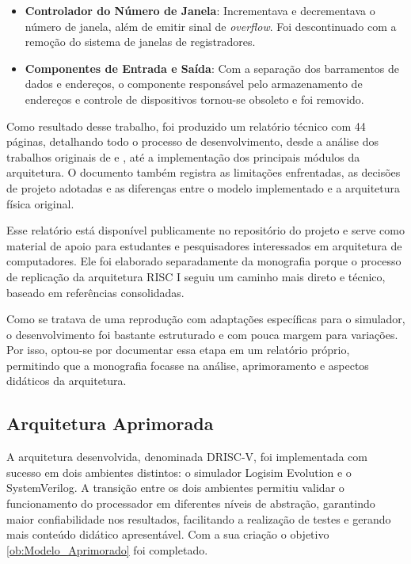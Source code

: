 \documentclass[
	12pt,				%
	openright,			%
	oneside,			%
	a4paper,			%
	english,			%
	french,				%
	spanish,			%
	brazil,				%
	]{abntex2}
\begin{document}
\begin{itemize}
    \item \textbf{Controlador do Número de Janela}: Incrementava e decrementava o número de janela, além de emitir sinal de \textit{overflow}. Foi descontinuado com a remoção do sistema de janelas de registradores.

    \item \textbf{Componentes de Entrada e Saída}: Com a separação dos barramentos de dados e endereços, o componente responsável pelo armazenamento de endereços e controle de dispositivos tornou-se obsoleto e foi removido.
\end{itemize}

Como resultado desse trabalho, foi produzido um relatório técnico com 44 páginas, detalhando todo o processo de desenvolvimento, desde a análise dos trabalhos originais de  e , até a implementação dos principais módulos da arquitetura. O documento também registra as limitações enfrentadas, as decisões de projeto adotadas e as diferenças entre o modelo implementado e a arquitetura física original.

Esse relatório está disponível publicamente no repositório do projeto e serve como material de apoio para estudantes e pesquisadores interessados em arquitetura de computadores. Ele foi elaborado separadamente da monografia porque o processo de replicação da arquitetura RISC I seguiu um caminho mais direto e técnico, baseado em referências consolidadas.

Como se tratava de uma reprodução com adaptações específicas para o simulador, o desenvolvimento foi bastante estruturado e com pouca margem para variações. Por isso, optou-se por documentar essa etapa em um relatório próprio, permitindo que a monografia focasse na análise, aprimoramento e aspectos didáticos da arquitetura.

\subsection{Arquitetura Aprimorada}

A arquitetura desenvolvida, denominada DRISC-V, foi implementada com sucesso em dois ambientes distintos: o simulador Logisim Evolution e o SystemVerilog. A transição entre os dois ambientes permitiu validar o funcionamento do processador em diferentes níveis de abstração, garantindo maior confiabilidade nos resultados, facilitando a realização de testes e gerando mais conteúdo didático apresentável. Com a sua criação o objetivo \ref{ob:Modelo_Aprimorado} foi completado.
\end{document}
